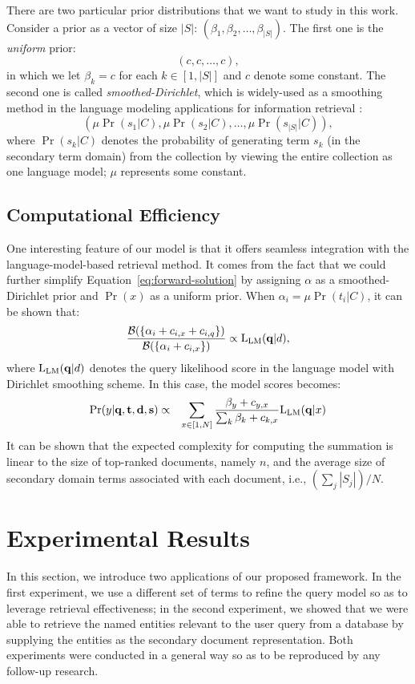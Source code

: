 There are two particular prior distributions that we want to study in this
work.  Consider a prior as a vector of size $|S|$: $(\beta_1, \beta_2, \ldots,
\beta_{|S|})$.  The first one is the \emph{uniform} prior: \[ (c, c, \ldots,
c), \] in which we let $\beta_k = c$ for each $k \in [1, |S|]$ and $c$ denote
some constant.  The second one is called \emph{smoothed-Dirichlet}, which is
widely-used as a smoothing method in the language modeling applications for
information retrieval \cite{zhai2004study}: \[ (\mu \Pr(s_1|C), \mu \Pr(s_2|C),
\ldots, \mu \Pr(s_{|S|}|C)), \] where $\Pr(s_k|C)$ denotes the probability of
generating term $s_k$ (in the secondary term domain) from the collection by
viewing the entire collection as one language model; $\mu$ represents some
constant.

\subsection{Computational Efficiency}

One interesting feature of our model is
that it offers seamless integration with the language-model-based retrieval
method.  It comes from the fact that we could further simplify
Equation~\eqref{eq:forward-solution} by assigning $\alpha$ as a
smoothed-Dirichlet prior and $\Pr(x)$ as a uniform prior.  When $\alpha_i = \mu
\Pr(t_i|C)$, it can be shown that: \[ \frac{\mathcal{B}(\{\alpha_i + c_{i,x} +
c_{i,q} \})}{\mathcal{B}(\{\alpha_i + c_{i,x} \})} \propto {\rm L}_{\rm
LM}(\mathbf{q}|d), \] where ${\rm L}_{\rm LM}(\mathbf{q}|d)$ denotes the query
likelihood score in the language model with Dirichlet smoothing scheme.  In
this case, the model scores becomes:
\begin{eqnarray}
  \Pr(y|\mathbf{q}, \mathbf{t}, \mathbf{d}, \mathbf{s}) &\propto& 
  \sum_{x \in [1, N]} \frac{\beta_y + c_{y,x}}{\sum_k \beta_k + c_{k,x}}
  {\rm L}_{\rm LM}(\mathbf{q}|x)
\end{eqnarray} 
It can be shown that the expected complexity for computing the summation is
linear to the size of top-ranked documents, namely $n$, and the average size of
secondary domain terms associated with each document, i.e., $(\sum_j |S_j|)/N$.

\section{Experimental Results}\label{s:experimental-results}

In this section, we introduce two applications of our proposed framework.  In
the first experiment, we use a different set of terms to refine the query model
so as to leverage retrieval effectiveness; in the second experiment, we showed
that we were able to retrieve the named entities relevant to the user query
from a database by supplying the entities as the secondary document
representation.  Both experiments were conducted in a general way so as to be
reproduced by any follow-up research.


